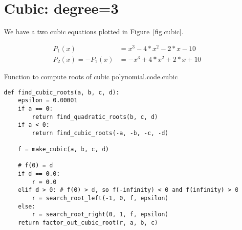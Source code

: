 \section{Cubic: degree=3}
\label{sec.cubic}

We have a two cubic equations plotted in Figure~\ref{fig.cubic}.

\begin{align*}
  P_1(x) &= x^3 - 4*x^2 - 2*x - 10\\
  P_2(x) = -P_1(x) &= -x^3 + 4*x^2 + 2*x + 10
\end{align*}


\begin{listing}{Function to compute roots of cubic polynomial.}{code.cubic}
\begin{minipage}[c]{0.98\textwidth}\begin{lstlisting}
def find_cubic_roots(a, b, c, d):
    epsilon = 0.00001
    if a == 0:
        return find_quadratic_roots(b, c, d)
    if a < 0:
        return find_cubic_roots(-a, -b, -c, -d)

    f = make_cubic(a, b, c, d)

    # f(0) = d
    if d == 0.0:
        r = 0.0
    elif d > 0: # f(0) > d, so f(-infinity) < 0 and f(infinity) > 0
        r = search_root_left(-1, 0, f, epsilon)
    else:
        r = search_root_right(0, 1, f, epsilon)
    return factor_out_cubic_root(r, a, b, c)
\end{lstlisting}\end{minipage}\end{listing}

